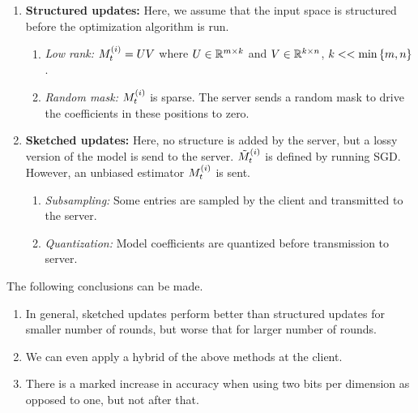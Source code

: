 \documentclass[twoside]{article}
\begin{document}
\begin{enumerate}
    \item \textbf{Structured updates:} Here, we assume that the input space is structured
        before the optimization algorithm is run.
        \begin{enumerate}
            \item \emph{Low rank:} \(M_t^{\left(i\right)} = UV\) where \(U\in\mathbb R^{m\times k}\)
                and \(V\in\mathbb R^{k\times n}\), \(k << \min\left\{m,n\right\}\).
            \item \emph{Random mask:} \(M_t^{\left(i\right)}\) is sparse. The server sends
                a random mask to drive the coefficients in these positions to 
                zero.
        \end{enumerate}
    \item \textbf{Sketched updates:} Here, no structure is added by the server, but a lossy 
        version of the model is send to the server. \(\tilde{M}_t^{\left(i\right)}\) 
        is defined by running SGD. However, an unbiased estimator \(M_t^{\left(i\right)}\)
        is sent.
        \begin{enumerate}
            \item \emph{Subsampling:} Some entries are sampled by the client and 
                transmitted to the server.
            \item \emph{Quantization:} Model coefficients are quantized before
                transmission to server.
        \end{enumerate}
\end{enumerate}

The following conclusions can be made.
\begin{enumerate}
    \item In general, sketched updates perform better than structured updates 
    for smaller number of rounds, but worse that for larger number of rounds. 
    \item We can even apply a hybrid of the above methods at the client.
    \item There is a marked increase in accuracy when using two bits per 
    dimension as opposed to one, but not after that.
\end{enumerate}
\end{document}
